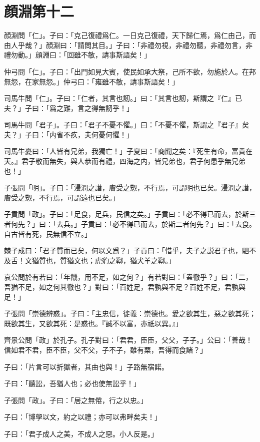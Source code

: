 \section[顔淵第十二]{顔淵第十二}

顔淵問「仁」。子曰：「克己復禮爲仁。一日克己復禮，天下歸仁焉，爲仁由己，而由人乎哉？」顔淵曰：「請問其目。」子曰：「非禮勿視，非禮勿聽，非禮勿言，非禮勿動。」顔淵曰：「回雖不敏，請事斯語矣！」

仲弓問「仁」。子曰：「出門如見大賓，使民如承大祭，己所不欲，勿施於人。在邦無怨，在家無怨。」仲弓曰：「雍雖不敏，請事斯語矣！」

司馬牛問「仁」。子曰：「仁者，其言也訒。」曰：「其言也訒，斯謂之『仁』已夫？」子曰：「爲之難，言之得無訒乎！」

司馬牛問「君子」。子曰：「君子不憂不懼。」曰：「不憂不懼，斯謂之『君子』矣夫？」子曰：「内省不疚，夫何憂何懼！」

司馬牛憂曰：「人皆有兄弟，我獨亡！」子夏曰：「商聞之矣：『死生有命，富貴在天。』君子敬而無失，與人恭而有禮，四海之内，皆兄弟也，君子何患乎無兄弟也！」

子張問「明」。子曰：「浸潤之譖，膚受之愬，不行焉，可謂明也已矣。浸潤之譖，膚受之愬，不行焉，可謂遠也已矣。」

子貢問「政」。子曰：「足食，足兵，民信之矣。」子貢曰：「必不得已而去，於斯三者何先？」曰：「去兵。」子貢曰：「必不得已而去，於斯二者何先？」曰：「去食。自古皆有死，民無信不立。」

棘子成曰：「君子質而已矣，何以文爲？」子貢曰：「惜乎，夫子之説君子也，駟不及舌！文猶質也，質猶文也；虎豹之鞹，猶犬羊之鞹。」

哀公問於有若曰：「年饑，用不足，如之何？」有若對曰：「盍徹乎？」曰：「二，吾猶不足，如之何其徹也？」對曰：「百姓足，君孰與不足？百姓不足，君孰與足！」

子張問「崇德辨惑」。子曰：「主忠信，徙義：崇德也。愛之欲其生，惡之欲其死；既欲其生，又欲其死：是惑也。『誠不以富，亦祇以異。』」

齊景公問「政」於孔子。孔子對曰：「君君，臣臣，父父，子子。」公曰：「善哉！信如君不君，臣不臣，父不父，子不子，雖有粟，吾得而食諸？」

子曰：「片言可以折獄者，其由也與！」子路無宿諾。

子曰：「聽訟，吾猶人也；必也使無訟乎！」

子張問「政」。子曰：「居之無倦，行之以忠。」

子曰：「博學以文，約之以禮；亦可以弗畔矣夫！」

子曰：「君子成人之美，不成人之惡。小人反是。」

